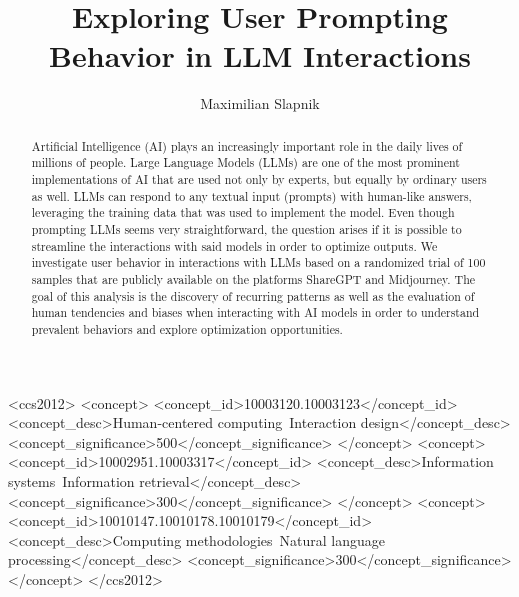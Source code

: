 \documentclass[sigconf]{acmart}
\begin{document}
\title[Prompting Behavior in LLM Interactions]{Exploring User Prompting Behavior in LLM Interactions}

\author{Maximilian Slapnik}


\begin{abstract}
  \sloppy
  Artificial Intelligence (AI) plays an increasingly important role in the daily lives of
  millions of people.
  Large Language Models (LLMs) are one of the most prominent implementations of AI that are used
  not only by experts, but equally by ordinary users as well.
  LLMs can respond to any textual input (prompts) with human-like answers, leveraging the
  training data that was used to implement the model.
  Even though prompting LLMs seems very straightforward, the question arises if it is possible
  to streamline the interactions with said models in order to optimize outputs.
  We investigate user behavior in interactions with LLMs based on a randomized trial of 100
  samples that are publicly available on the platforms ShareGPT and Midjourney.
  The goal of this analysis is the discovery of recurring patterns as well as the
  evaluation of human tendencies and biases when interacting with AI models in
  order to understand prevalent behaviors and explore optimization opportunities.
\end{abstract}



\begin{CCSXML}
  <ccs2012>
  <concept>
  <concept_id>10003120.10003123</concept_id>
  <concept_desc>Human-centered computing~Interaction design</concept_desc>
  <concept_significance>500</concept_significance>
  </concept>
  <concept>
  <concept_id>10002951.10003317</concept_id>
  <concept_desc>Information systems~Information retrieval</concept_desc>
  <concept_significance>300</concept_significance>
  </concept>
  <concept>
  <concept_id>10010147.10010178.10010179</concept_id>
  <concept_desc>Computing methodologies~Natural language processing</concept_desc>
  <concept_significance>300</concept_significance>
  </concept>
  </ccs2012>
\end{CCSXML}

\end{document}
